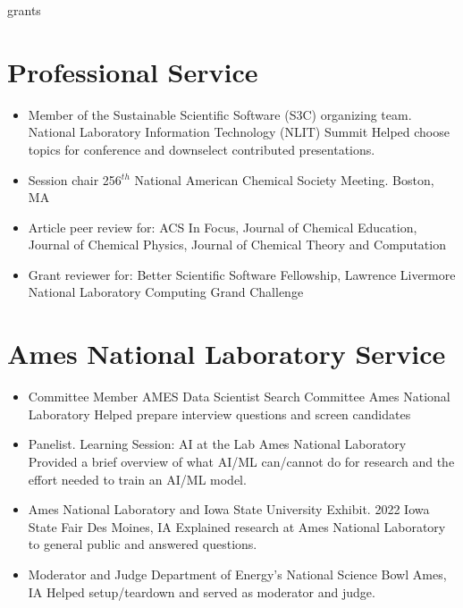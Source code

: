 \documentclass[11pt,a4paper,sans]{moderncv}
\begin{document}
{grants}


\section{Professional Service}
\vspace{5pt}
\begin{itemize}
	\item{
		  {Member of the Sustainable Scientific Software (S3C) organizing team.}  
	      {National Laboratory Information Technology (NLIT) Summit}
		  {}
		  {}
		  {Helped choose topics for conference and downselect contributed 
		  presentations.}}
	\item{
	        {Session chair}
                {256$^{th}$ National American Chemical Society Meeting.}
                {Boston, MA}
                {}
                {}}

	\item{\cventry{}
          	{Article peer review for:}
		{}
          	{}
          	{}
          	{ACS In Focus,
           	Journal of Chemical Education,
           	Journal of Chemical Physics,
           	Journal of Chemical Theory and Computation}
	}
    \item{\cventry{}
          	{Grant reviewer for:}
          	{}
          	{}
          	{}
          	{Better Scientific Software Fellowship, Lawrence Livermore National Laboratory Computing Grand Challenge}}
\end{itemize}

\section{Ames National Laboratory Service}
\vspace{5pt}
\begin{itemize}
	\item{
	        {Committee Member}
	        {AMES Data Scientist Search Committee}
	        {Ames National Laboratory}
	        {}
	        {Helped prepare interview questions and screen candidates}
	}
	\item{
		{Panelist.}
		{Learning Session: AI at the Lab}
		{Ames National Laboratory}
		{}
		{Provided a brief overview of what AI/ML can/cannot do for research and
		 the effort needed to train an AI/ML model.}
	}
	\item{
		{Ames National Laboratory and Iowa State University Exhibit.}
	         {2022 Iowa State Fair}
		 {Des Moines, IA}
		 {}
		 {Explained research at Ames National Laboratory to general public and
		   answered questions.}
	}
		\item{
          {Moderator and Judge}
          {Department of Energy's National Science Bowl}
          {Ames, IA}
          {}
          {Helped setup/teardown and served as moderator and judge.}}
\end{itemize}
\end{document}
